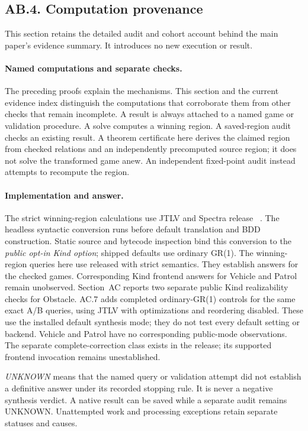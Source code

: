 \subsection*{AB.4. Computation provenance}
This section retains the detailed audit and cohort account behind the
main paper's evidence summary. It introduces no new execution or result.

\paragraph{Named computations and separate checks.}

The preceding proofs explain the mechanisms. This section and the current
evidence index distinguish the computations that corroborate them from
other checks that remain incomplete. A result is always attached to a named game or
validation procedure. A solve computes a winning region. A saved-region
audit checks an existing result. A theorem certificate here derives the
claimed region from checked relations and an independently precomputed
source region; it does not solve the transformed game anew. An independent
fixed-point audit instead attempts to recompute the region.



\paragraph{Implementation and answer.}
The strict winning-region calculations use JTLV and Spectra release
~\cite{spectrarelease2024}. The headless syntactic conversion runs
before default translation and BDD construction. Static source and
bytecode inspection bind this conversion to the \emph{public opt-in Kind
option}; shipped defaults use ordinary GR(1). The winning-region queries
here use released  with strict semantics. They establish
answers for the checked games. Corresponding Kind frontend answers for
Vehicle and Patrol remain unobserved. Section~AC
reports two separate public Kind realizability checks for Obstacle.
AC.7 adds completed ordinary-GR(1) controls for the same exact A/B queries,
using JTLV with optimizations and reordering disabled. These use the
installed default synthesis mode; they do not test every default setting
or backend. Vehicle and Patrol have no corresponding public-mode
observations. The separate complete-correction class exists in the
release; its supported frontend invocation remains unestablished.

\emph{UNKNOWN} means that the named query or validation attempt did not
establish a definitive answer under its recorded stopping rule. It is
never a negative synthesis verdict. A native result can be saved while
a separate audit remains UNKNOWN. Unattempted work and processing
exceptions retain separate statuses and causes.



